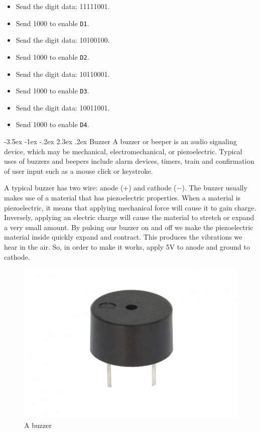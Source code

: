 \documentclass[13pt,a4paper,twoside]{report}
\makeatletter
\renewcommand\section{\@startsection {section}{1}{-1em}%
  {-3.5ex \@plus -1ex \@minus -.2ex}%
  {2.3ex \@plus.2ex}%
  {\normalfont\Large\bfseries}}
\makeatother
\begin{document}
\begin{multicols}{2}
\begin{itemize}
\item Send the  digit data: 11111001.
\item Send 1000 to enable \texttt{D1}.

\item Send the  digit data: 10100100.
\item Send 1000 to enable \texttt{D2}.

\item Send the  digit data: 10110001.
\item Send 1000 to enable \texttt{D3}.

\item Send the  digit data: 10011001.
\item Send 1000 to enable \texttt{D4}.
\end{itemize}
\end{multicols}

\section{Buzzer}
A buzzer or beeper is an audio signaling device, which may be mechanical, electromechanical, or piezoelectric. Typical uses of buzzers and beepers include alarm devices, timers, train and confirmation of user input such as a mouse click or keystroke.

A typical buzzer has two wire: anode (+) and cathode ($-$). The buzzer usually makes use of a material that has piezoelectric properties. When a material is piezoelectric, it means that applying mechanical force will cause it to gain charge. Inversely, applying an electric charge will cause the material to stretch or expand a very small amount. By pulsing our buzzer on and off we make the piezoelectric material inside quickly expand and contract. This produces the vibrations we hear in the air. So, in order to make it works, apply 5V to anode and ground to cathode.

\begin{figure}[H]
\centering
\includegraphics[scale=0.2]{images/buzzer.jpg}
\caption{A buzzer}
\end{figure}
\end{document}
